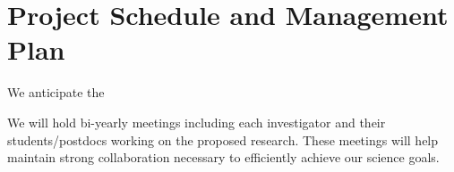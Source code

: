 \section{Project Schedule and Management Plan}

We anticipate the 

We will  hold bi-yearly meetings including each investigator and their students/postdocs working on the proposed research. These meetings will help maintain strong collaboration necessary to efficiently achieve our science goals.
